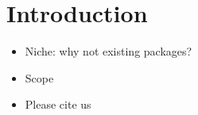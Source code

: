 \chapter{Introduction}

\begin{itemize}
    \item Niche: why not existing packages?
    \item Scope
    \item Please cite us
\end{itemize}
